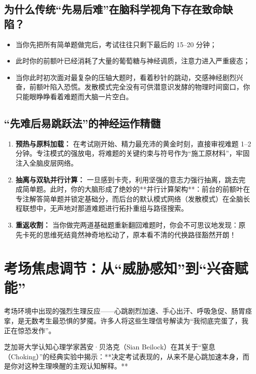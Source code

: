 \documentclass[12pt,a4paper,openany]{ctexbook}
\begin{document}
\subsection*{为什么传统“先易后难”在脑科学视角下存在致命缺陷？}

\begin{itemize}
    \item 当你先把所有简单题做完后，考试往往只剩下最后的 15--20 分钟；
    \item 此时你的前额叶已经消耗了大量的葡萄糖与神经调质，注意力进入严重疲态；
    \item 当你此时初次面对最复杂的压轴大题时，看着秒针的跳动，交感神经剧烈兴奋，前额叶陷入恐慌。发散模式完全没有可供潜意识发酵的物理时间窗口，你只能眼睁睁看着难题而大脑一片空白。
\end{itemize}

\subsection*{“先难后易跳跃法”的神经运作精髓}

\begin{enumerate}
    \item \textbf{预热与原料加载：} 
    在考试刚开始、精力最充沛的黄金时刻，直接审视难题 1--2 分钟。专注模式的强放电，将难题的关键约束与符号作为“施工原材料”，牢固注入全脑皮层网络。
    
    \item \textbf{抽离与双轨并行计算：} 
    一旦感到卡壳，利用坚强的意志力强行抽离，跳去完成简单题。此时，你的大脑形成了绝妙的**并行计算架构**：前台的前额叶在专注解答简单题并锁定基础分，而后台的默认模式网络（发散模式）在全脑长程联想中，无声地对那道难题进行拓扑重组与路径搜索。
    
    \item \textbf{重返收割：} 
    当你做完两道基础题重新翻回难题时，你会不可思议地发现：原先卡死的思维死结竟然神奇地松动了，原本看不清的代换路径豁然开朗！
\end{enumerate}

\section{考场焦虑调节：从“威胁感知”到“兴奋赋能”}

考场环境中出现的强烈生理反应——心跳剧烈加速、手心出汗、呼吸急促、肠胃痉挛，是无数考生最恐惧的梦魇。许多人将这些生理信号解读为“我彻底完蛋了，我正在惊恐发作”。

芝加哥大学认知心理学家茜安·贝洛克（Sian Beilock）在其关于“窒息（Choking）”的经典实验中揭示：**决定考试表现的，从来不是心跳加速本身，而是你对这种生理唤醒的主观认知解释。**
\end{document}

